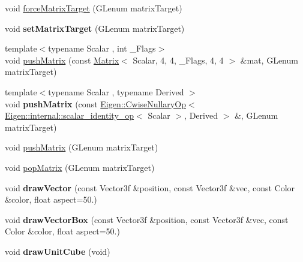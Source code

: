 \begin{DoxyCompactItemize}
\item 
void \hyperlink{class_gpu_helper_a52a9ab12d07acbf4ad80737595a9b06e}{force\+Matrix\+Target} (G\+Lenum matrix\+Target)
\item 
\mbox{\label{class_gpu_helper_a310cd4e00d7e8b63771391da3a62943e}} 
void {\bfseries set\+Matrix\+Target} (G\+Lenum matrix\+Target)
\item 
{\footnotesize template$<$typename Scalar , int \+\_\+\+Flags$>$ }\\void \hyperlink{class_gpu_helper_ac51c8b669a80ca6e4338c87136fb991e}{push\+Matrix} (const \hyperlink{group___core___module_class_eigen_1_1_matrix}{Matrix}$<$ Scalar, 4, 4, \+\_\+\+Flags, 4, 4 $>$ \&mat, G\+Lenum matrix\+Target)
\item 
\mbox{\label{class_gpu_helper_a73feb2db6afad42ecac360a6c6a4e84f}} 
{\footnotesize template$<$typename Scalar , typename Derived $>$ }\\void {\bfseries push\+Matrix} (const \hyperlink{group___core___module_class_eigen_1_1_cwise_nullary_op}{Eigen\+::\+Cwise\+Nullary\+Op}$<$ \hyperlink{struct_eigen_1_1internal_1_1scalar__identity__op}{Eigen\+::internal\+::scalar\+\_\+identity\+\_\+op}$<$ Scalar $>$, Derived $>$ \&, G\+Lenum matrix\+Target)
\item 
void \hyperlink{class_gpu_helper_a515a9248689ca95d90a1919b2e6973ec}{push\+Matrix} (G\+Lenum matrix\+Target)
\item 
void \hyperlink{class_gpu_helper_aad0cc23c2eaf0dcc610b180e5c8b195e}{pop\+Matrix} (G\+Lenum matrix\+Target)
\item 
\mbox{\label{class_gpu_helper_a0d2c77ee60d1954d609af0ca1075fb06}} 
void {\bfseries draw\+Vector} (const Vector3f \&position, const Vector3f \&vec, const Color \&color, float aspect=50.)
\item 
\mbox{\label{class_gpu_helper_a31bf94099a0d4d70bdc86a881f5661ed}} 
void {\bfseries draw\+Vector\+Box} (const Vector3f \&position, const Vector3f \&vec, const Color \&color, float aspect=50.)
\item 
\mbox{\label{class_gpu_helper_a56e1a7dc525c50f0aef95860bccde68b}} 
void {\bfseries draw\+Unit\+Cube} (void)
\item 
\mbox{\label{class_gpu_helper_a11c4e7fce24ba5ec6fb22d94f5a340ee}} 

\end{DoxyCompactItemize}
